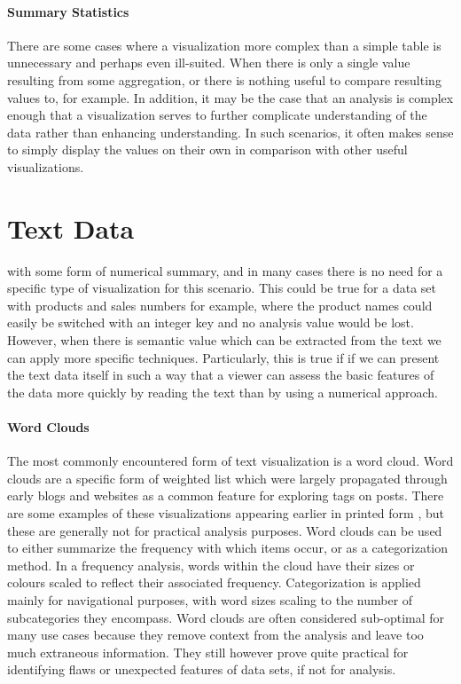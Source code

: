 \paragraph{Summary Statistics}
There are some cases where a visualization more complex than a simple table is unnecessary and perhaps even ill-suited. When there is only a single value resulting from some aggregation, or there is nothing useful to compare resulting values to, for example. In addition, it may be the case that an analysis is complex enough that a visualization serves to further complicate understanding of the data rather than enhancing understanding. In such scenarios, it often makes sense to simply display the values on their own in comparison with other useful visualizations.


\section{Text Data}
\label{sec:text_data}
 with some form of numerical summary, and in many cases there is no need for a specific type of visualization for this scenario. This could be true for a data set with products and sales numbers for example, where the product names could easily be switched with an integer key and no analysis value would be lost. However, when there is semantic value which can be extracted from the text we can apply more specific techniques. Particularly, this is true if if we can present the text data itself in such a way that a viewer can assess the basic features of the data more quickly by reading the text than by using a numerical approach.

\paragraph{Word Clouds}
The most commonly encountered form of text visualization is a word cloud. Word clouds are a specific form of weighted list which were largely propagated through early blogs and websites as a common feature for exploring tags on posts. There are some examples of these visualizations appearing earlier in printed form \cite{Deleuze1987}, but these are generally not for practical analysis purposes. Word clouds can be used to either summarize the frequency with which items occur, or as a categorization method. In a frequency analysis, words within the cloud have their sizes or colours scaled to reflect their associated frequency. Categorization is applied mainly for navigational purposes, with word sizes scaling to the number of subcategories they encompass. Word clouds are often considered sub-optimal for many use cases because they remove context from the analysis and leave too much extraneous information. They still however prove quite practical for identifying flaws or unexpected features of data sets, if not for analysis. 

